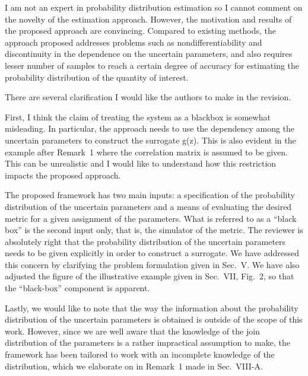 \begin{reviewer}
I am not an expert in probability distribution estimation so I cannot comment on
the novelty of the estimation approach. However, the motivation and results of
the proposed approach are convincing. Compared to existing methods, the approach
proposed addresses problems such as nondifferentiability and discontinuity in
the dependence on the uncertain parameters, and also requires lesser number of
samples to reach a certain degree of accuracy for estimating the probability
distribution of the quantity of interest.

There are several clarification I would like the authors to make in the
revision.

First, I think the claim of treating the system as a blackbox is somewhat
misleading. In particular, the approach needs to use the dependency among the
uncertain parameters to construct the surrogate g(z). This is also evident in
the example after Remark~1 where the correlation matrix is assumed to be given.
This can be unrealistic and I would like to understand how this restriction
impacts the proposed approach.
\end{reviewer}

\begin{authors}
The proposed framework has two main inputs: a specification of the probability
distribution of the uncertain parameters and a means of evaluating the desired
metric for a given assignment of the parameters. What is referred to as a
``black box'' is the second input only, that is, the simulator of the metric.
The reviewer is absolutely right that the probability distribution of the
uncertain parameters needs to be given explicitly in order to construct a
surrogate. We have addressed this concern by clarifying the problem formulation
given in Sec.~V. We have also adjusted the figure of the illustrative example
given in Sec.~VII, Fig.~2, so that the ``black-box'' component is apparent.

Lastly, we would like to note that the way the information about the probability
distribution of the uncertain parameters is obtained is outside of the scope of
this work. However, since we are well aware that the knowledge of the join
distribution of the parameters is a rather impractical assumption to make, the
framework has been tailored to work with an incomplete knowledge of the
distribution, which we elaborate on in Remark~1 made in Sec.~VIII-A.

\begin{actions}

\end{actions}
\end{authors}

